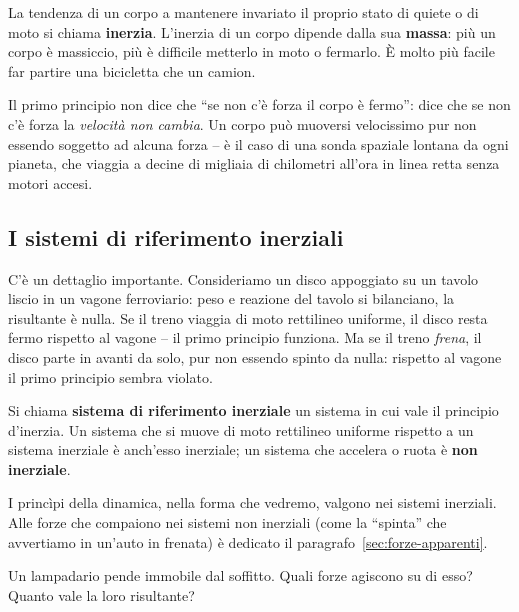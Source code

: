 La tendenza di un corpo a mantenere invariato il proprio stato di quiete o di moto si chiama \textbf{inerzia}. L'inerzia di un corpo dipende dalla sua \textbf{massa}: più un corpo è massiccio, più è difficile metterlo in moto o fermarlo. È molto più facile far partire una bicicletta che un camion.

\begin{remark}
Il primo principio non dice che ``se non c'è forza il corpo è fermo'': dice che se non c'è forza la \emph{velocità non cambia}. Un corpo può muoversi velocissimo pur non essendo soggetto ad alcuna forza -- è il caso di una sonda spaziale lontana da ogni pianeta, che viaggia a decine di migliaia di chilometri all'ora in linea retta senza motori accesi.
\end{remark}

\subsection{I sistemi di riferimento inerziali}
C'è un dettaglio importante. Consideriamo un disco appoggiato su un tavolo liscio in un vagone ferroviario: peso e reazione del tavolo si bilanciano, la risultante è nulla. Se il treno viaggia di moto rettilineo uniforme, il disco resta fermo rispetto al vagone -- il primo principio funziona. Ma se il treno \emph{frena}, il disco parte in avanti da solo, pur non essendo spinto da nulla: rispetto al vagone il primo principio sembra violato.

\begin{definizione}
Si chiama \textbf{sistema di riferimento inerziale} un sistema in cui vale il principio d'inerzia. Un sistema che si muove di moto rettilineo uniforme rispetto a un sistema inerziale è anch'esso inerziale; un sistema che accelera o ruota è \textbf{non inerziale}.
\end{definizione}

I princìpi della dinamica, nella forma che vedremo, valgono nei sistemi inerziali. Alle forze che compaiono nei sistemi non inerziali (come la ``spinta'' che avvertiamo in un'auto in frenata) è dedicato il paragrafo~\ref{sec:forze-apparenti}.

\begin{esercizio}
Un lampadario pende immobile dal soffitto. Quali forze agiscono su di esso? Quanto vale la loro risultante?\\
\end{esercizio}

